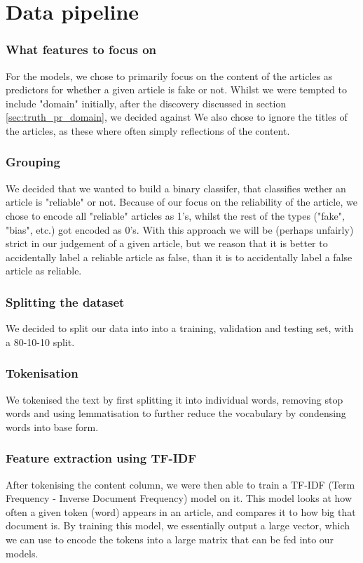 \section*{Data pipeline}
\subsubsection{What features to focus on}
For the models, we chose to primarily focus on the content of the articles as predictors for whether a given article is
fake or not. Whilst we were tempted to include "domain" initially, after the discovery discussed in section \ref{sec:truth_pr_domain},
we decided against We also chose to ignore the titles of the articles, as these where often simply reflections of the
content.

\subsubsection{Grouping}
We decided that we wanted to build a binary classifer, that classifies wether an article is "reliable" or not. Because of our focus on the reliability of
the article, we chose to encode all "reliable" articles as 1's, whilst the rest of the types ("fake", "bias", etc.) got
encoded as 0's. With this approach we will be (perhaps unfairly) strict in our judgement of a given article, but we
reason that it is better to accidentally label a reliable article as false, than it is to accidentally label a false
article as reliable.

\subsubsection{Splitting the dataset}
We decided to split our data into into a training, validation and testing set, with a 80-10-10 split.

\subsubsection{Tokenisation}
We tokenised the text by first splitting it into
individual words, removing stop words and using lemmatisation to further reduce the vocabulary by condensing words into
base form.

\subsubsection{Feature extraction using TF-IDF}
After tokenising the content column, we were then able to train a TF-IDF (Term Frequency - Inverse Document Frequency)
model on it. This model looks at how often a given token (word) appears in an article, and compares it to how big that
document is. By training this model, we essentially output a large vector, which we can use to encode the tokens into a
large matrix that can be fed into our models.

